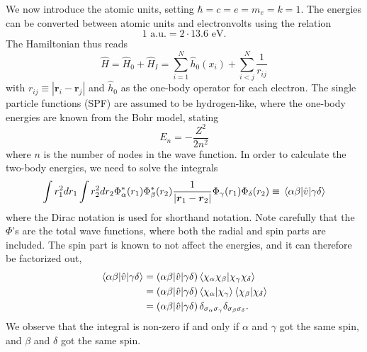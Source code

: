 We now introduce the atomic units, setting $\hbar=c=e=m_e=k=1$. 
The energies can be converted between atomic units and electronvolts using the relation
\begin{equation}
1 \text{ a.u.} = 2\cdot13.6 \text{ eV}.
\end{equation}
The Hamiltonian thus reads
\begin{equation}
\hat{H}=\hat{H}_0 + \hat{H}_I=\sum_{i=1}^N\hat{h}_0(x_i)+\sum_{i<j}^N\frac{1}{r_{ij}}
\end{equation}
with $r_{ij}\equiv|\boldsymbol{r}_i-\boldsymbol{r}_j|$ and $\hat{h}_0$ as the one-body operator for each electron. The single particle functions (SPF) are assumed to be hydrogen-like, where the one-body energies are known from the Bohr model, stating
\begin{equation}
E_n=-\frac{Z^2}{2n^2}
\end{equation}
where $n$ is the number of nodes in the wave function. In order to calculate the two-body energies, we need to solve the integrals 
\begin{equation}
\int r_1^2dr_1\int r_2^2dr_2 \Phi_{\alpha}^*(r_1)\Phi_{\beta}^*(r_2)\frac{1}{|\boldsymbol{r}_1-\boldsymbol{r}_2|}\Phi_{\gamma}(r_1)\Phi_{\delta}(r_2)\equiv\mel{\alpha\beta}{\hat{v}}{\gamma\delta}
\end{equation}
where the Dirac notation is used for shorthand notation. Note carefully that the $\Phi$'s are the total wave functions, where both the radial and spin parts are included. The spin part is known to not affect the energies, and it can therefore be factorized out,
\begin{align}
\mel{\alpha\beta}{\hat{v}}{\gamma\delta}&=(\alpha\beta|\hat{v}|\gamma\delta)\braket{\chi_{\alpha}\chi_{\beta}}{\chi_{\gamma}\chi_{\delta}}\notag\\
&=(\alpha\beta|\hat{v}|\gamma\delta)\braket{\chi_{\alpha}}{\chi_{\gamma}}\braket{\chi_{\beta}}{\chi_{\delta}}\\
&=(\alpha\beta|\hat{v}|\gamma\delta)\,\delta_{\sigma_{\alpha}\sigma_{\gamma}}\delta_{\sigma_{\beta}\sigma_{\delta}}.\notag
\end{align}
We observe that the integral is non-zero if and only if $\alpha$ and $\gamma$ got the same spin, and $\beta$ and $\delta$ got the same spin.

